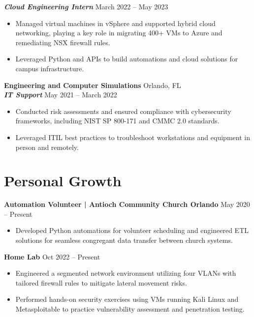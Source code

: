 \documentclass[10pt, letterpaper]{article}
\begin{document}
\vspace{5pt}
\textbf{\textit{Cloud Engineering Intern}} \hfill March 2022 -- May 2023
\begin{itemize}
    \item Managed virtual machines in vSphere and supported hybrid cloud networking, playing a key role in migrating 400+ VMs to Azure and remediating NSX firewall rules.
    \item Leveraged Python and APIs to build automations and cloud solutions for campus infrastructure.
\end{itemize}

\vspace{10pt}
\textbf{Engineering and Computer Simulations} \hfill Orlando, FL \\
\textbf{\textit{IT Support}} \hfill May 2021 -- March 2022
\begin{itemize}
    \item Conducted risk assessments and ensured compliance with cybersecurity frameworks, including NIST SP 800-171 and CMMC 2.0 standards.
    \item Leveraged ITIL best practices to troubleshoot workstations and equipment in person and remotely.
\end{itemize}

\section{Personal Growth}

\textbf{Automation Volunteer | Antioch Community Church Orlando} \hfill May 2020 -- Present
\begin{itemize}
    \item Developed Python automations for volunteer scheduling and engineered ETL solutions for seamless congregant data transfer between church systems.
\end{itemize}

\vspace{8pt}
\textbf{Home Lab} \hfill Oct 2022 -- Present
\begin{itemize}
    \item Engineered a segmented network environment utilizing four VLANs with tailored firewall rules to mitigate lateral movement risks.
    \item Performed hands-on security exercises using VMs running Kali Linux and Metasploitable to practice vulnerability assessment and penetration testing.
\end{itemize}
\end{document}
